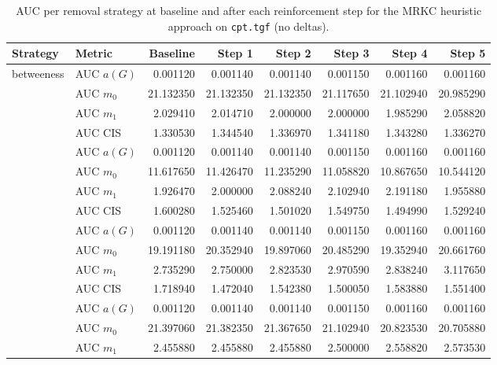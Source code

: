 \begin{table}[htbp]
  \centering
  \caption{AUC per removal strategy at baseline and after each reinforcement step for the MRKC heuristic approach on \texttt{cpt.tgf} (no deltas).}
  \label{tab:cpt-mrkc_heuristic-auc}
  \begin{tabular}{llrrrrrr}
    \toprule
    \textbf{Strategy} & \textbf{Metric} & \textbf{Baseline} & \textbf{Step 1} & \textbf{Step 2} & \textbf{Step 3} & \textbf{Step 4} & \textbf{Step 5} \\
    \midrule
    \multirow{4}{*}{betweeness} & AUC $a(G)$ & 0.001120 & 0.001140 & 0.001140 & 0.001150 & 0.001160 & 0.001160 \\
    & AUC $m_0$ & 21.132350 & 21.132350 & 21.132350 & 21.117650 & 21.102940 & 20.985290 \\
    & AUC $m_1$ & 2.029410 & 2.014710 & 2.000000 & 2.000000 & 1.985290 & 2.058820 \\
    & AUC CIS & 1.330530 & 1.344540 & 1.336970 & 1.341180 & 1.343280 & 1.336270 \\
    \addlinespace
    \multirow{4}{*}{closeness} & AUC $a(G)$ & 0.001120 & 0.001140 & 0.001140 & 0.001150 & 0.001160 & 0.001160 \\
    & AUC $m_0$ & 11.617650 & 11.426470 & 11.235290 & 11.058820 & 10.867650 & 10.544120 \\
    & AUC $m_1$ & 1.926470 & 2.000000 & 2.088240 & 2.102940 & 2.191180 & 1.955880 \\
    & AUC CIS & 1.600280 & 1.525460 & 1.501020 & 1.549750 & 1.494990 & 1.529240 \\
    \addlinespace
    \multirow{4}{*}{core influence} & AUC $a(G)$ & 0.001120 & 0.001140 & 0.001140 & 0.001150 & 0.001160 & 0.001160 \\
    & AUC $m_0$ & 19.191180 & 20.352940 & 19.897060 & 20.485290 & 19.352940 & 20.661760 \\
    & AUC $m_1$ & 2.735290 & 2.750000 & 2.823530 & 2.970590 & 2.838240 & 3.117650 \\
    & AUC CIS & 1.718940 & 1.472040 & 1.542380 & 1.500050 & 1.583880 & 1.551400 \\
    \addlinespace
    \multirow{4}{*}{degree} & AUC $a(G)$ & 0.001120 & 0.001140 & 0.001140 & 0.001150 & 0.001160 & 0.001160 \\
    & AUC $m_0$ & 21.397060 & 21.382350 & 21.367650 & 21.102940 & 20.823530 & 20.705880 \\
    & AUC $m_1$ & 2.455880 & 2.455880 & 2.455880 & 2.500000 & 2.558820 & 2.573530 \\

\end{tabular}
\end{table}
